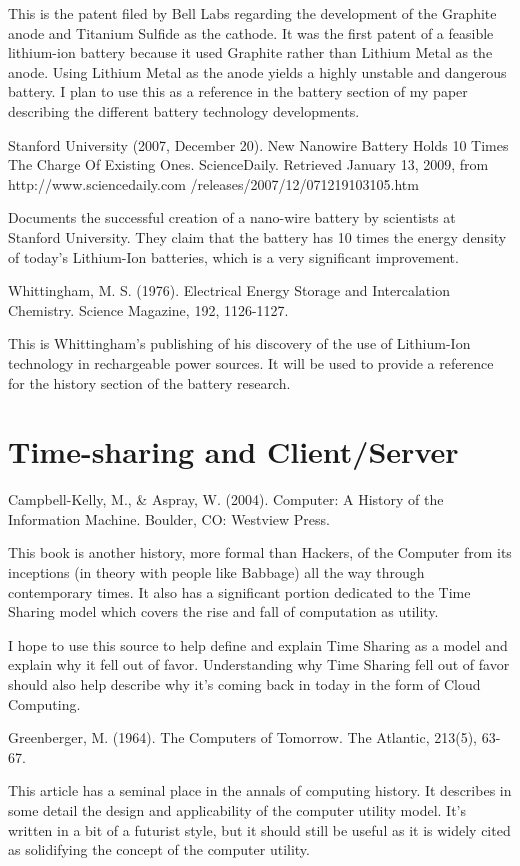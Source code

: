 \documentclass[12pt,oneside,letterpaper,titlepage]{article}
\begin{document}
This is the patent filed by Bell Labs regarding the development of the Graphite
anode and Titanium Sulfide as the cathode.  It was the first patent of a
feasible lithium-ion battery because it used Graphite rather than Lithium Metal
as the anode.  Using Lithium Metal as the anode yields a highly unstable and
dangerous battery.  I plan to use this as a reference in the battery section of
my paper describing the different battery technology developments.

Stanford University (2007, December 20). New Nanowire Battery Holds 10 Times The Charge Of Existing Ones. ScienceDaily. Retrieved January 13, 2009, from http://www.sciencedaily.com /releases/2007/12/071219103105.htm

Documents the successful creation of a nano-wire battery by scientists at
Stanford University.  They claim that the battery has 10 times the energy
density of today's Lithium-Ion batteries, which is a very significant
improvement.

Whittingham, M. S. (1976). Electrical Energy Storage and Intercalation Chemistry. Science Magazine, 192, 1126-1127.

This is Whittingham's publishing of his discovery of the use of Lithium-Ion
technology in rechargeable power sources.  It will be used to provide a
reference for the history section of the battery research.

\section{Time-sharing and Client/Server}

Campbell-Kelly, M., & Aspray, W. (2004). Computer: A History of the Information Machine. Boulder, CO: Westview Press.

This book is another history, more formal than Hackers, of the Computer from its
inceptions (in theory with people like Babbage) all the way through contemporary
times. It also has a significant portion dedicated to the Time Sharing model
which covers the rise and fall of computation as utility.

I hope to use this source to help define and explain Time Sharing as a model and
explain why it fell out of favor. Understanding why Time Sharing fell out of
favor should also help describe why it's coming back in today in the form of
Cloud Computing.

Greenberger, M. (1964). The Computers of Tomorrow. The Atlantic, 213(5), 63-67.

This article has a seminal place in the annals of computing history.  It
describes in some detail the design and applicability of the computer utility
model.  It's written in a bit of a futurist style, but it should still be useful
as it is widely cited as solidifying the concept of the computer utility.
\end{document}
